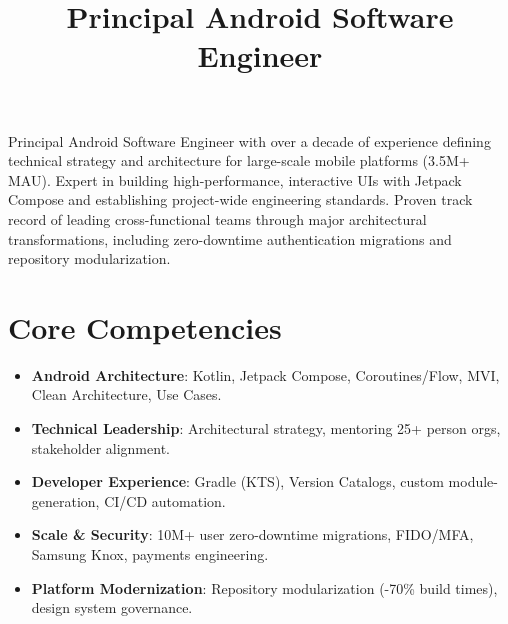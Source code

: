 \documentclass[11pt,a4paper,sans]{moderncv}
\title{Principal Android Software Engineer}
\begin{document}
\makecvtitle


\vspace{6pt}
\small{Principal Android Software Engineer with over a decade of experience defining technical strategy and architecture for large-scale mobile platforms (3.5M+ MAU). Expert in building high-performance, interactive UIs with Jetpack Compose and establishing project-wide engineering standards. Proven track record of leading cross-functional teams through major architectural transformations, including zero-downtime authentication migrations and repository modularization.}

\section{Core Competencies}
\vspace{1pt}
\begin{itemize}
\item \textbf{\rmfamily Android Architecture}: Kotlin, Jetpack Compose, Coroutines/Flow, MVI, Clean Architecture, Use Cases.
\item \textbf{\rmfamily Technical Leadership}: Architectural strategy, mentoring 25+ person orgs, stakeholder alignment.
\item \textbf{\rmfamily Developer Experience}: Gradle (KTS), Version Catalogs, custom module-generation, CI/CD automation.
\item \textbf{\rmfamily Scale \& Security}: 10M+ user zero-downtime migrations, FIDO/MFA, Samsung Knox, payments engineering.
\item \textbf{\rmfamily Platform Modernization}: Repository modularization (-70\% build times), design system governance.
\end{itemize}

\end{document}
